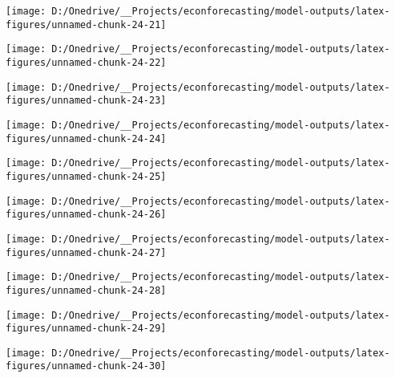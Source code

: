 \documentclass[11pt, letterpaper]{article}\usepackage[]{graphicx}\usepackage[]{color}
\begin{document}
{\centering \texttt{[image: D:/Onedrive/\_\_Projects/econforecasting/model-outputs/latex-figures/unnamed-chunk-24-21]} 

}




{\centering \texttt{[image: D:/Onedrive/\_\_Projects/econforecasting/model-outputs/latex-figures/unnamed-chunk-24-22]} 

}




{\centering \texttt{[image: D:/Onedrive/\_\_Projects/econforecasting/model-outputs/latex-figures/unnamed-chunk-24-23]} 

}




{\centering \texttt{[image: D:/Onedrive/\_\_Projects/econforecasting/model-outputs/latex-figures/unnamed-chunk-24-24]} 

}




{\centering \texttt{[image: D:/Onedrive/\_\_Projects/econforecasting/model-outputs/latex-figures/unnamed-chunk-24-25]} 

}




{\centering \texttt{[image: D:/Onedrive/\_\_Projects/econforecasting/model-outputs/latex-figures/unnamed-chunk-24-26]} 

}




{\centering \texttt{[image: D:/Onedrive/\_\_Projects/econforecasting/model-outputs/latex-figures/unnamed-chunk-24-27]} 

}




{\centering \texttt{[image: D:/Onedrive/\_\_Projects/econforecasting/model-outputs/latex-figures/unnamed-chunk-24-28]} 

}




{\centering \texttt{[image: D:/Onedrive/\_\_Projects/econforecasting/model-outputs/latex-figures/unnamed-chunk-24-29]} 

}




{\centering \texttt{[image: D:/Onedrive/\_\_Projects/econforecasting/model-outputs/latex-figures/unnamed-chunk-24-30]} 

}
\end{document}
